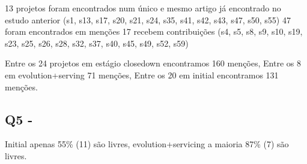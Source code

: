 
%

  13 projetos foram encontrados num único e mesmo artigo já encontrado no estudo anterior
    (s1, s13, s17, s20, s21, s24, s35, s41, s42, s43, s47, s50, s55)
  47 foram encontrados em menções
    17 recebem contribuições
      (s4, s5, s8, s9, s10, s19, s23, s25, s26, s28, s32, s37, s40, s45, s49, s52, s59)

Entre os 24 projetos em estágio closedown encontramos 160 menções,
Entre os 8 em evolution+serving 71 menções,
Entre os 20 em initial encontramos 131 menções.

%
%
%

\subsection{Q5 - \QuestaoCinco} %

Initial apenas 55\% (11) são livres, evolution+servicing a maioria 87\% (7) são livres.

